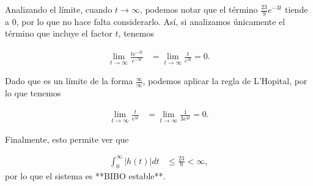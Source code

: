 \documentclass[
  11pt,
  letterpaper,
   addpoints,
   answers
  ]{exam}
\begin{document}
\begin{questions}
    Analizando el límite, cuando $t \to \infty$, podemos notar que el término $\frac{23}{9} e^{-3t}$ tiende a $0$, por lo que no hace falta considerarlo. Así, si analizamos únicamente el término que incluye el factor $t$, tenemos
    
    \begin{align}
    \lim_{t \to \infty} \frac{t e^{-3t}}{e^{-3t}} &= \lim_{t \to \infty} \frac{t}{e^{3t}} = 0.
    \end{align}
    
    Dado que es un límite de la forma $\frac{\infty}{\infty}$, podemos aplicar la regla de L'Hopital, por lo que tenemos
    
    \begin{align}
    \lim_{t \to \infty} \frac{t}{e^{3t}} &= \lim_{t \to \infty} \frac{1}{3e^{3t}} = 0.
    \end{align}
    
    Finalmente, esto permite ver que
    
    \begin{align}
    \int_0^\infty |h(t)| dt &\leq \frac{23}{9} < \infty,
    \end{align}
    por lo que el sistema es **BIBO estable**.

\end{questions}
\end{document}
